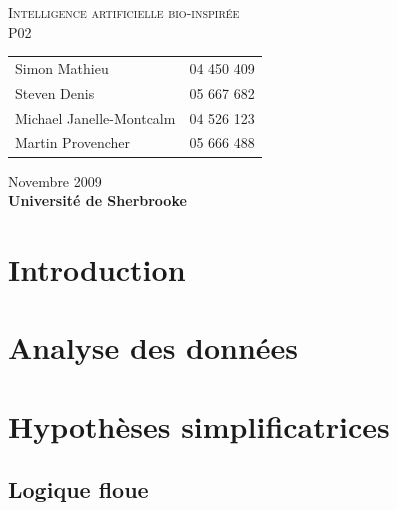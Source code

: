 \documentclass[12pt,letterpaper]{article}
\begin{document}
\renewcommand{\labelitemi}{$\bullet$}
\newcommand{\unit}[1]{\ \mathrm{#1}}
\newcommand{\degree}{\ensuremath{^\circ}}

\thispagestyle{empty}
\begin{center}
	\vspace{20pt}
	\large{\textsc{
		Intelligence artificielle bio-inspirée\\
	}}
	\vspace{20pt}
	\large{\textsc{
		P02
	}}
	\vfill
	\begin{tabular}{ll}
      Simon Mathieu & 04 450 409 \\
      Steven Denis & 05 667 682 \\
      Michael Janelle-Montcalm & 04 526 123 \\
      Martin Provencher &	05 666 488 \\
	\end{tabular}
	\vfill
	Novembre 2009 \\
	\textbf{Université de Sherbrooke}
	\vspace{20pt}
\end{center}
\clearpage
\begin{spacing}{0.1}
\tableofcontents
\end{spacing}
\clearpage

\section{Introduction}

\section{Analyse des données} %

\section{Hypothèses simplificatrices}

\subsection{Logique floue}
\end{document}
